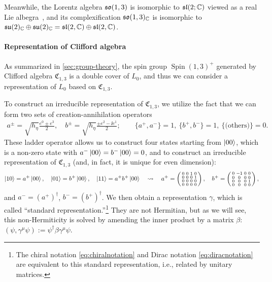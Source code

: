 \documentclass[CheatSheet]{subfiles}
\begin{document}
Meanwhile, the Lorentz algebra $\operatorname{\mathfrak{so}}(1,3)$ is isomorphic to $\operatorname{\mathfrak{sl}}(2;\mathbb C)$ viewed as a real Lie albegra~\cite[\S7.8]{Hall2015},
and its complexification
$\operatorname{\mathfrak{so}}(1,3)_{\mathbb C}$ is isomorphic to $
\operatorname{\mathfrak{su}}(2)_{\mathbb C}\oplus\operatorname{\mathfrak{su}}(2)_{\mathbb C}
=\operatorname{\mathfrak{sl}}(2,\mathbb C)\oplus\operatorname{\mathfrak{sl}}(2,\mathbb C)$.

\paragraph{Representation of Clifford algebra}
As summarized in \cref{sec:group-theory}, the spin group $\mathop{\mathrm{Spin}}(1,3)^+$ generated by Clifford algebra $\mathfrak C_{1,3}$ is a double cover of $L_0$, and thus we can consider a representation of $L_0$ based on $\mathfrak C_{1,3}$.

To construct an irreducible representation of $\mathfrak C_{1,3}$, we utilize the fact that we can form two sets of creation-annihilation operators
\begin{align}
 a^\pm = \sqrt{h_\eta}\frac{e^0\pm e^3}{2},\quad
 b^\pm = \sqrt{h_\eta}\frac{\pm e^2-\ii e^1}{2};\qquad
 \{a^+,a^-\}=1,~
 \{b^+,b^-\}=1,~
 \{\text{(others)}\} = 0.
\end{align}
These ladder operator allows us to construct four states starting from $\ket{00}$, which is a non-zero state with $a^-\ket{00}=b^-\ket{00}=0$, and to construct an irreducible representation of $\mathfrak C_{1,3}$ (and, in fact, it is unique for even dimension):
\begin{equation}
 \ket{10} = a^+\ket{00},\quad
 \ket{01} = b^+\ket{00},\quad
 \ket{11} = a^+b^+\ket{00}\quad\leadsto\quad
 a^+=\left(\begin{smallmatrix}0&0&1&0\\0&0&0&1\\0&0&0&0\\0&0&0&0\end{smallmatrix}\right),\quad
 b^+=\left(\begin{smallmatrix}0&-1&0&0\\0&0&0&0\\0&0&0&1\\0&0&0&0\end{smallmatrix}\right),
\end{equation}
and $a^-=(a^+)^\dagger$, $b^-=(b^+)^\dagger$.
We then obtain a representation $\gamma$, which is called ``standard representation.''\footnote{The chiral notation \eqref{eq:chiralnotation} and Dirac notation \eqref{eq:diracnotation} are equivalent to this standard representation, i.e., related by unitary matrices.}
They are not Hermitian, but as we will see, this non-Hermiticity is solved by amending the inner product by a matrix $\beta$: $(\psi,\gamma^\mu\psi):=\psi^\dagger\beta \gamma^\mu\psi$.
\end{document}
